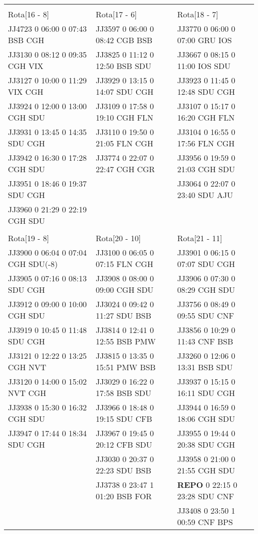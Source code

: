 \begin{scriptsize}
\begin{longtable}{l l l}
& & \\

Rota[16 - 8]  & Rota[17 - 6]  & Rota[18 - 7] \\
JJ4723 0 06:00 0 07:43 BSB CGH & JJ3597 0 06:00 0 08:42 CGB BSB & JJ3770 0 06:00 0 07:00 GRU IOS\\
JJ3130 0 08:12 0 09:35 CGH VIX & JJ3825 0 11:12 0 12:50 BSB SDU & JJ3667 0 08:15 0 11:00 IOS SDU\\
JJ3127 0 10:00 0 11:29 VIX CGH & JJ3929 0 13:15 0 14:07 SDU CGH & JJ3923 0 11:45 0 12:48 SDU CGH\\
JJ3924 0 12:00 0 13:00 CGH SDU & JJ3109 0 17:58 0 19:10 CGH FLN & JJ3107 0 15:17 0 16:20 CGH FLN\\
JJ3931 0 13:45 0 14:35 SDU CGH & JJ3110 0 19:50 0 21:05 FLN CGH & JJ3104 0 16:55 0 17:56 FLN CGH\\
JJ3942 0 16:30 0 17:28 CGH SDU & JJ3774 0 22:07 0 22:47 CGH CGR & JJ3956 0 19:59 0 21:03 CGH SDU\\
JJ3951 0 18:46 0 19:37 SDU CGH & & JJ3064 0 22:07 0 23:40 SDU AJU\\
JJ3960 0 21:29 0 22:19 CGH SDU & & \\

& & \\

Rota[19 - 8]  & Rota[20 - 10]  & Rota[21 - 11] \\
JJ3900 0 06:04 0 07:04 CGH SDU(-8) & JJ3100 0 06:05 0 07:15 FLN CGH & JJ3901 0 06:15 0 07:07 SDU CGH\\
JJ3905 0 07:16 0 08:13 SDU CGH & JJ3908 0 08:00 0 09:00 CGH SDU & JJ3906 0 07:30 0 08:29 CGH SDU\\
JJ3912 0 09:00 0 10:00 CGH SDU & JJ3024 0 09:42 0 11:27 SDU BSB & JJ3756 0 08:49 0 09:55 SDU CNF\\
JJ3919 0 10:45 0 11:48 SDU CGH & JJ3814 0 12:41 0 12:55 BSB PMW & JJ3856 0 10:29 0 11:43 CNF BSB\\
JJ3121 0 12:22 0 13:25 CGH NVT & JJ3815 0 13:35 0 15:51 PMW BSB & JJ3260 0 12:06 0 13:31 BSB SDU\\
JJ3120 0 14:00 0 15:02 NVT CGH & JJ3029 0 16:22 0 17:58 BSB SDU & JJ3937 0 15:15 0 16:11 SDU CGH\\
JJ3938 0 15:30 0 16:32 CGH SDU & JJ3966 0 18:48 0 19:15 SDU CFB & JJ3944 0 16:59 0 18:06 CGH SDU\\
JJ3947 0 17:44 0 18:34 SDU CGH & JJ3967 0 19:45 0 20:12 CFB SDU & JJ3955 0 19:44 0 20:38 SDU CGH\\
 & JJ3030 0 20:37 0 22:23 SDU BSB & JJ3958 0 21:00 0 21:55 CGH SDU\\
 & JJ3738 0 23:47 1 01:20 BSB FOR & \textbf{REPO}   0 22:15 0 23:28 SDU CNF\\
 &  & JJ3408 0 23:50 1 00:59 CNF BPS\\


\end{longtable}
\end{scriptsize}
